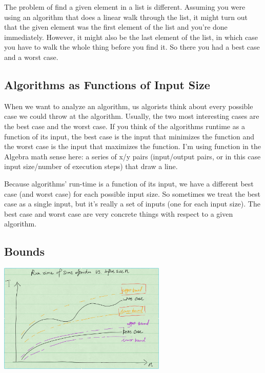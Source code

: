 \documentclass[en,hazy,blue,screen,14pt]{elegantnote}
\begin{document}
The problem of \textquotedbl find a given element in a list\textquotedbl{}
is different. Assuming you were using an algorithm that does a linear
walk through the list, it might turn out that the given element was
the first element of the list and you're done immediately. However,
it might also be the last element of the list, in which case you have
to walk the whole thing before you find it. So there you had a best
case and a worst case.

\subsection{Algorithms as Functions of Input Size}

When we want to analyze an algorithm, us algorists think about every
possible case we could throw at the algorithm. Usually, the two most
interesting cases are the best case and the worst case. If you think
of the algorithms runtime as a function of its input, the best case
is the input that minimizes the function and the worst case is the
input that maximizes the function. I'm using \textquotedbl function\textquotedbl{}
in the Algebra math sense here: a series of x/y pairs (input/output
pairs, or in this case \textquotedbl input size/number of execution
steps\textquotedbl ) that draw a line.

Because algorithms' run-time is a function of its input, we have a
different best case (and worst case) for each possible input size.
So sometimes we treat the best case as a single input, but it's really
a set of inputs (one for each input size). The best case and worst
case are very concrete things with respect to a given algorithm.

\subsection{Bounds }

\centerline{\includegraphics[width=0.6\textwidth]{bounds.png}}
\end{document}
